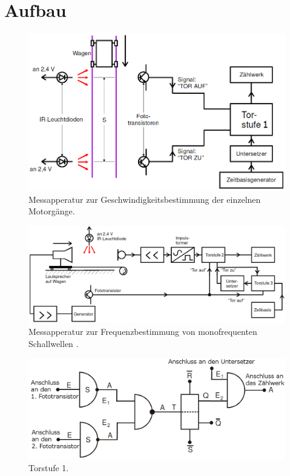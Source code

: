 \section{Aufbau}
\label{sec:Aufbau}
\begin{figure}
	\centering
	\includegraphics[width=\linewidth-50pt,height=\textheight-50pt,keepaspectratio]{content/Bilder/Geschwindigkeitsmessung.png}
	\caption{Messapperatur zur Geschwindigkeitsbestimmung der einzelnen Motorgänge\cite{V104}.}
	\label{fig:Aufbau}
\end{figure}
\begin{figure}
	\centering
	\includegraphics[width=\linewidth-50pt,height=\textheight-50pt,keepaspectratio]{content/Bilder/Frequenzmessung.png}
	\caption{Messapperatur zur Frequenzbestimmung von monofrequenten Schallwellen \cite{V104}.}
	\label{fig:Aufbau}
\end{figure}
\begin{figure}
	\centering
	\includegraphics[width=\linewidth-50pt,height=\textheight-50pt,keepaspectratio]{content/Bilder/Torstufe1.png}
	\caption{Torstufe 1\cite{V104}.}
	\label{fig:Aufbau}
\end{figure}
